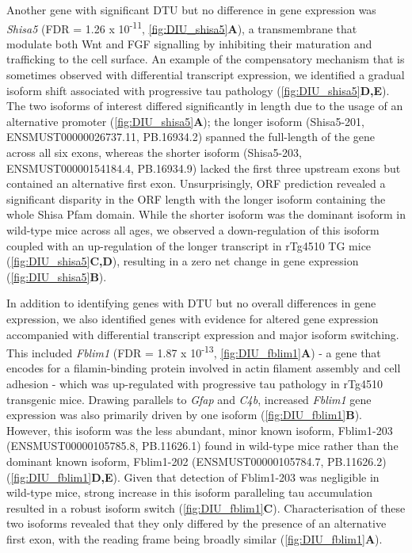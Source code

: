 Another gene with significant DTU but no difference in gene expression was \textit{Shisa5} (FDR = 1.26 x 10\textsuperscript{-11}, \cref{fig:DIU_shisa5}\textbf{A}), a transmembrane that modulate both Wnt and FGF signalling by inhibiting their maturation and trafficking to the cell surface\cite{Yamamoto2005}. An example of the compensatory mechanism that is sometimes observed with differential transcript expression, we identified a gradual isoform shift associated with progressive tau pathology (\cref{fig:DIU_shisa5}\textbf{D,E}). The two isoforms of interest differed significantly in length due to the usage of an alternative promoter (\cref{fig:DIU_shisa5}\textbf{A}); the longer isoform (Shisa5-201, ENSMUST00000026737.11, PB.16934.2) spanned the full-length of the gene across all six exons, whereas the shorter isoform (Shisa5-203, ENSMUST00000154184.4, PB.16934.9) lacked the first three upstream exons but contained an alternative first exon. Unsurprisingly, ORF prediction revealed a significant disparity in the ORF length with the longer isoform containing the whole Shisa Pfam domain. While the shorter isoform was the dominant isoform in wild-type mice across all ages, we observed a down-regulation of this isoform coupled with an up-regulation of the longer transcript in rTg4510 TG mice (\cref{fig:DIU_shisa5}\textbf{C,D}), resulting in a zero net change in gene expression (\cref{fig:DIU_shisa5}\textbf{B}). 

In addition to identifying genes with DTU but no overall differences in gene expression, we also identified genes with evidence for altered gene expression accompanied with differential transcript expression and major isoform switching. This included \textit{Fblim1} (FDR = 1.87 x 10\textsuperscript{-13}, \cref{fig:DIU_fblim1}\textbf{A}) - a gene that encodes for a filamin-binding protein involved in actin filament assembly and cell adhesion\cite{Takafuta2003} - which was up-regulated with progressive tau pathology in rTg4510 transgenic mice. Drawing parallels to \textit{Gfap} and \textit{C4b}, increased \textit{Fblim1} gene expression was also primarily driven by one isoform (\cref{fig:DIU_fblim1}\textbf{B}). However, this isoform was the less abundant, minor known isoform, Fblim1-203 (ENSMUST00000105785.8, PB.11626.1) found in wild-type mice rather than the dominant known isoform, Fblim1-202 (ENSMUST00000105784.7, PB.11626.2) (\cref{fig:DIU_fblim1}\textbf{D,E}). Given that detection of Fblim1-203 was negligible in wild-type mice, strong increase in this isoform paralleling tau accumulation resulted in a robust isoform switch (\cref{fig:DIU_fblim1}\textbf{C}). Characterisation of these two isoforms revealed that they only differed by the presence of an alternative first exon, with the reading frame being broadly similar (\cref{fig:DIU_fblim1}\textbf{A}). 

